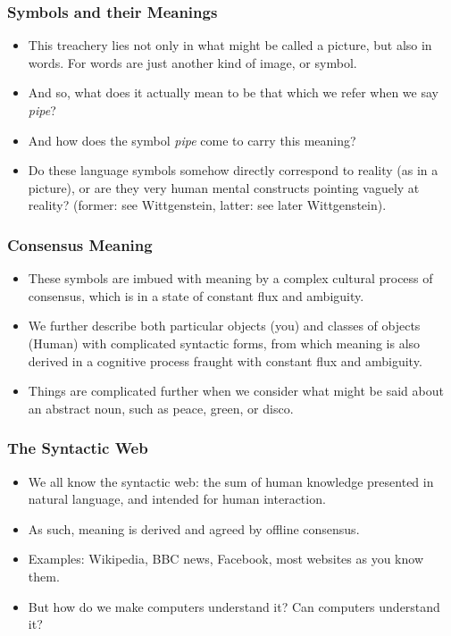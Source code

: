 \documentclass[aspectratio=169]{beamer} %
\begin{document}
\begin{frame}
\frametitle{Symbols and their Meanings}

\begin{itemize}
  \item This treachery lies not only in what might be called a picture, but also
  in words. For words are just another kind of image, or symbol.
  \item And so, what does it actually mean to be that which we refer when we say
  \emph{pipe}?
  \item And how does the symbol \emph{pipe} come to carry this meaning?
  \item Do these language symbols somehow
  directly correspond to reality (as in a picture), or are they very human mental
  constructs pointing vaguely at reality? (former: see Wittgenstein, latter: see
  later Wittgenstein).
\end{itemize}
\end{frame}

\begin{frame}
\frametitle{Consensus Meaning}

\begin{itemize}
  \item These symbols are imbued with meaning by a complex cultural process of
  consensus, which is in a state of constant flux and ambiguity.
  \item We further describe both particular objects (you) and classes of objects
  (Human) with complicated syntactic forms, from which meaning is also derived
  in a cognitive process fraught with constant flux and ambiguity.
  \item Things are complicated further when we consider what might be said 
  about an abstract noun, such as peace, green, or disco.
\end{itemize}
\end{frame}

\begin{frame}
\frametitle{The Syntactic Web}
\begin{itemize}
  \item We all know the syntactic web: the sum of human knowledge presented in natural 
  language, and intended for human interaction.
  \item As such, meaning is derived and agreed by offline consensus.
  \item Examples: Wikipedia, BBC news, Facebook, most websites as you know them.
  \item But how do we make computers understand it? Can computers understand it?
\end{itemize}
\end{frame}
\end{document}

